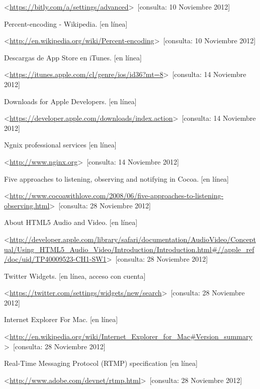 \begin{thebibliography}{99}
\begin{sloppypar}
\textless \url{https://bitly.com/a/settings/advanced}\textgreater \ [consulta: 10 Noviembre 2012] 

%
Percent-encoding - Wikipedia. [en línea]\

\textless \url{http://en.wikipedia.org/wiki/Percent-encoding}\textgreater \ [consulta: 10 Noviembre 2012] 

%
Descargas de App Store en iTunes. [en línea]\

\textless \url{https://itunes.apple.com/cl/genre/ios/id36?mt=8}\textgreater \ [consulta: 14 Noviembre 2012] 

%
Downloads for Apple Developers. [en línea]\

\textless \url{https://developer.apple.com/downloads/index.action}\textgreater \ [consulta: 14 Noviembre 2012]

%
Ngnix professional services [en línea]\

\textless \url{http://www.nginx.org}\textgreater \ [consulta: 14 Noviembre 2012]

%
Five approaches to listening, observing and notifying in Cocoa. [en línea]\

\textless \url{http://www.cocoawithlove.com/2008/06/five-approaches-to-listening-observing.html}\textgreater \ [consulta: 28 Noviembre 2012]

%
About HTML5 Audio and Video. [en línea]\

\textless \url{http://developer.apple.com/library/safari/documentation/AudioVideo/Conceptual/Using_HTML5_Audio_Video/Introduction/Introduction.html\#//apple_ref/doc/uid/TP40009523-CH1-SW1}\textgreater \ [consulta: 28 Noviembre 2012]

%
Twitter Widgets. [en línea, acceso con cuenta]\

\textless \url{https://twitter.com/settings/widgets/new/search}\textgreater \ [consulta: 28 Noviembre 2012]

%
Internet Explorer For Mac. [en línea]\

\textless \url{http://en.wikipedia.org/wiki/Internet_Explorer_for_Mac\#Version_summary}\textgreater \ [consulta: 28 Noviembre 2012]

%
Real-Time Messaging Protocol (RTMP) specification [en línea]\

\textless \url{http://www.adobe.com/devnet/rtmp.html}\textgreater \ [consulta: 28 Noviembre 2012]


\end{sloppypar}
\end{thebibliography}

